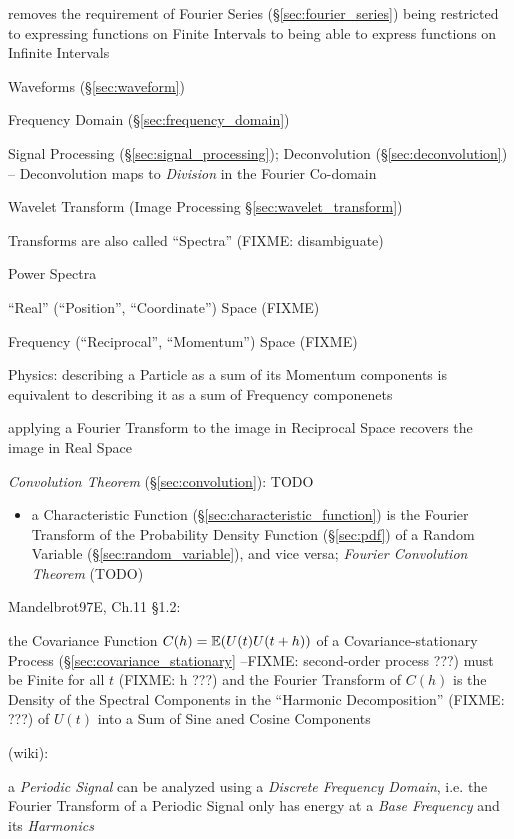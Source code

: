 {removes the requirement of Fourier Series (\S\ref{sec:fourier_series}) being
restricted to expressing functions on Finite Intervals to being able to express
functions on Infinite Intervals

\fist Waveforms (\S\ref{sec:waveform})

\fist Frequency Domain (\S\ref{sec:frequency_domain})

\fist Signal Processing (\S\ref{sec:signal_processing}); Deconvolution
(\S\ref{sec:deconvolution}) -- Deconvolution maps to \emph{Division} in the
Fourier Co-domain

\fist Wavelet Transform (Image Processing \S\ref{sec:wavelet_transform})

Transforms are also called ``Spectra'' (FIXME: disambiguate)

Power Spectra

``Real'' (``Position'', ``Coordinate'') Space (FIXME)

Frequency (``Reciprocal'', ``Momentum'') Space (FIXME)

Physics: describing a Particle as a sum of its Momentum components is equivalent
to describing it as a sum of Frequency componenets

applying a Fourier Transform to the image in Reciprocal Space recovers the image
in Real Space

\emph{Convolution Theorem} (\S\ref{sec:convolution}): TODO

\begin{itemize}
  \item a Characteristic Function (\S\ref{sec:characteristic_function}) is the
    Fourier Transform of the Probability Density Function (\S\ref{sec:pdf}) of a
    Random Variable (\S\ref{sec:random_variable}), and vice versa;
    \emph{Fourier Convolution Theorem} (TODO)
\end{itemize}

Mandelbrot97E, Ch.11 \S 1.2:

the Covariance Function $C(h) = \mathbb{E}(U(t) U(t + h))$ of a
Covariance-stationary Process (\S\ref{sec:covariance_stationary} --FIXME:
second-order process ???) must be Finite for all $t$ (FIXME: h ???) and the
Fourier Transform of $C(h)$ is the Density of the Spectral Components in the
``Harmonic Decomposition'' (FIXME: ???) of $U(t)$ into a Sum of Sine aned Cosine
Components


(wiki):

a \emph{Periodic Signal} can be analyzed using a \emph{Discrete Frequency
  Domain}, i.e. the Fourier Transform of a Periodic Signal only has energy at a
\emph{Base Frequency} and its \emph{Harmonics}

}
